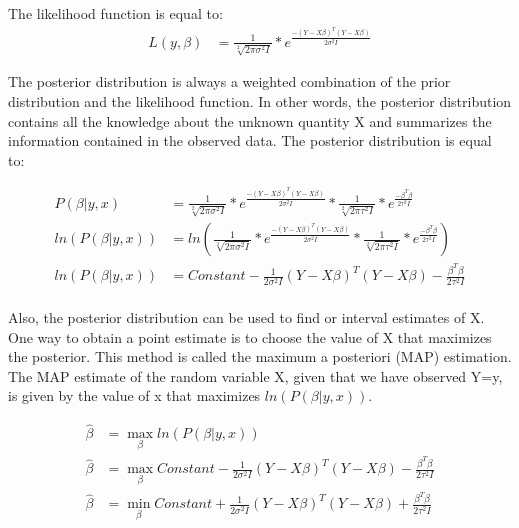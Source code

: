 \documentclass[12pt]{article}
\begin{document}
\begin{enumerate}
\begin{enumerate}
The likelihood function is equal to:
\begin{align*}
L(y,\beta) &=  \frac{1}{\sqrt[2]{2\pi\sigma^{2}I}} * e^{\frac{-(Y-X\beta)^T(Y-X\beta)}{2\sigma^{2}I}}
\end{align*}

The posterior distribution is always a weighted combination of the prior distribution and the likelihood function. In other words, the posterior distribution contains all the knowledge about the unknown quantity X and summarizes the information contained in the observed data. The posterior distribution is equal to:

\begin{align*}
P(\beta|y,x) &=  \frac{1}{\sqrt[2]{2\pi\sigma^{2}I}} * e^{\frac{-(Y-X\beta)^T(Y-X\beta)}{2\sigma^{2}I}} * \frac{1}{\sqrt[2]{2\pi\tau^{2}I}} * e^{\frac{-\beta^T\beta}{2\tau^{2}I}} \\
ln(P(\beta|y,x)) &= ln( \frac{1}{\sqrt[2]{2\pi\sigma^{2}I}} * e^{\frac{-(Y-X\beta)^T(Y-X\beta)}{2\sigma^{2}I}} * \frac{1}{\sqrt[2]{2\pi\tau^{2}I}} * e^{\frac{-\beta^T\beta}{2\tau^{2}I}}) \\
ln(P(\beta|y,x)) &= Constant - \frac{1}{2\sigma^{2}I}(Y-X\beta)^T(Y-X\beta) - \frac{\beta^T\beta}{2\tau^2I}
\end{align*}
\\

Also, the posterior distribution can be used to find or interval estimates of X. One way to obtain a point estimate is to choose the value of X that maximizes the posterior. This method is called the maximum a posteriori (MAP) estimation. The MAP estimate of the random variable X, given that we have observed Y=y, is given by the value of x that maximizes $ln(P(\beta|y,x))$. 

\begin{align*}
\hat\beta &= \max_{\beta} ln(P(\beta|y,x)) \\
\hat\beta &= \max_{\beta} Constant - \frac{1}{2\sigma^{2}I}(Y-X\beta)^T(Y-X\beta) - \frac{\beta^T\beta}{2\tau^2I} \\
\hat\beta &= \min_{\beta} Constant + \frac{1}{2\sigma^{2}I}(Y-X\beta)^T(Y-X\beta) + \frac{\beta^T\beta}{2\tau^2I} 
\end{align*}


\end{enumerate}
\end{enumerate}
\end{document}

